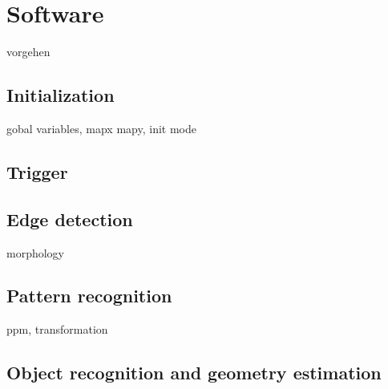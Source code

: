 \section{Software}
vorgehen

\subsection{Initialization}
gobal variables, mapx mapy, init mode

\subsection{Trigger}

\subsection{Edge detection}
morphology

\subsection{Pattern recognition}
ppm, transformation

\subsection{Object recognition and geometry estimation}
